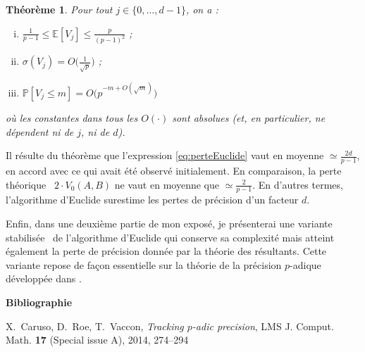 \documentclass[12pt,a4paper]{article}
\newcommand{\E}{\mathbb E}
\newcommand{\prob}{\mathbb P}
\newtheorem{theo}{Théorème}
\begin{document}
\begin{theo}
Pour tout $j \in \{0, \ldots, d-1\}$, on a :
\begin{enumerate}[i)]
\item $\frac 1 {p-1} \leq \E[V_j] \leq \frac p {(p-1)^2}$ ;
\item $\sigma(V_j) = O\big(\frac 1 {\sqrt p}\big)$ ;
\item $\prob[V_j \leq m] = O\big( p^{-m + O(\sqrt m)} \big)$
\end{enumerate}
où les constantes dans tous les $O(\cdot)$ sont absolues (et, en
particulier, ne dépendent ni de $j$, ni de $d$).
\end{theo}

Il résulte du théorème que l'expression \eqref{eq:perteEuclide} vaut en 
moyenne $\simeq \frac{2d}{p-1}$, en accord avec ce qui avait été 
observé initialement. En comparaison, la perte \og théorique \fg\ $2 
\cdot V_0(A,B)$ ne vaut en moyenne que $\simeq \frac 2 {p-1}$. En
d'autres termes, l'algorithme d'Euclide surestime les pertes de
précision d'un facteur $d$.

\bigskip

Enfin, dans une deuxième partie de mon exposé, je présenterai une 
variante \og stabilisée \fg\ de l'algorithme d'Euclide qui conserve sa 
complexité mais atteint également la perte de précision donnée par la 
théorie des résultants. Cette variante repose de façon essentielle sur
la théorie de la précision $p$-adique développée dans \cite{padicprec}.

\vspace{30pt}

\renewcommand{\section}[2]{}%
\textbf{Bibliographie}
\begin{thebibliography}{0}
{\sc X.~Caruso, D.~Roe, T.~Vaccon},
{\em Tracking $p$-adic precision},
LMS J. Comput. Math. {\bf 17} (Special issue A), 2014,  274--294
\end{thebibliography}
\end{document}
